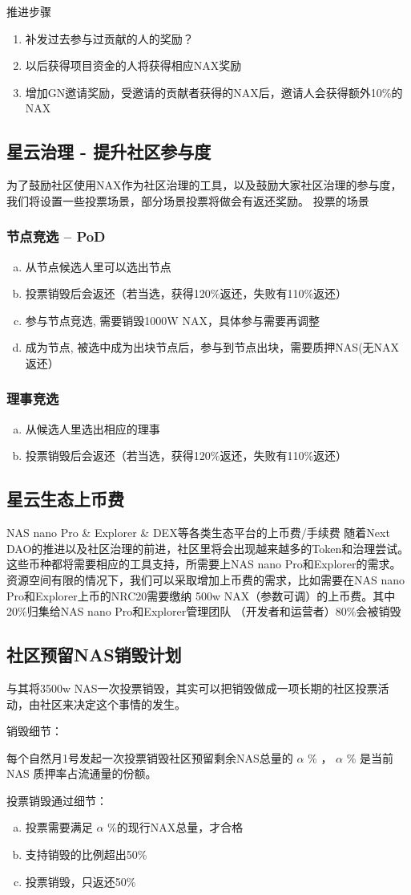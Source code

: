 推进步骤
\begin{enumerate}
\item 补发过去参与过贡献的人的奖励？
\item 以后获得项目资金的人将获得相应NAX奖励
\item 增加GN邀请奖励，受邀请的贡献者获得的NAX后，邀请人会获得额外10\%的NAX
\end{enumerate}

\subsection{星云治理 - 提升社区参与度}
为了鼓励社区使用NAX作为社区治理的工具，以及鼓励大家社区治理的参与度，我们将设置一些投票场景，部分场景投票将做会有返还奖励。
投票的场景

\subsubsection{节点竞选 -- PoD}
\begin{enumerate}[a.]
  \item 从节点候选人里可以选出节点
  \item 投票销毁后会返还（若当选，获得120\%返还，失败有110\%返还）
  \item 参与节点竞选, 需要销毁1000W NAX，具体参与需要再调整
  \item 成为节点, 被选中成为出块节点后，参与到节点出块，需要质押NAS(无NAX返还）
\end{enumerate}

\subsubsection{理事竞选}
\begin{enumerate}[a.]
  \item 从候选人里选出相应的理事
  \item 投票销毁后会返还（若当选，获得120\%返还，失败有110\%返还）
\end{enumerate}


\subsection{星云生态上币费}
NAS nano Pro \& Explorer \& DEX等各类生态平台的上币费/手续费
随着Next DAO的推进以及社区治理的前进，社区里将会出现越来越多的Token和治理尝试。这些币种都将需要相应的工具支持，所需要上NAS nano Pro和Explorer的需求。资源空间有限的情况下，我们可以采取增加上币费的需求，比如需要在NAS nano Pro和Explorer上币的NRC20需要缴纳 500w NAX（参数可调）的上币费。其中20\%归集给NAS nano Pro和Explorer管理团队 （开发者和运营者）80\%会被销毁

\subsection{社区预留NAS销毁计划}
与其将3500w NAS一次投票销毁，其实可以把销毁做成一项长期的社区投票活动，由社区来决定这个事情的发生。

销毁细节：

每个自然月1号发起一次投票销毁社区预留剩余NAS总量的 \(\alpha\) \% ， \(\alpha\) \% 是当前NAS 质押率占流通量的份额。

投票销毁通过细节：

\begin{enumerate}[a.]
  \item 投票需要满足 \(\alpha\) \%的现行NAX总量，才合格
  \item 支持销毁的比例超出50\%
  \item 投票销毁，只返还50\%
\end{enumerate}
